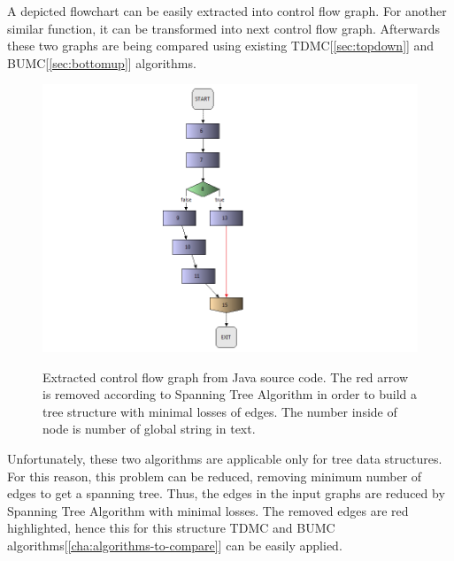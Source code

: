 \documentclass{report}
\begin{document}
A depicted flowchart can be easily extracted into control flow graph. For another similar function, it can be transformed into next control flow graph. Afterwards these two graphs are being compared using existing TDMC[\ref{sec:topdown}] and BUMC[\ref{sec:bottomup}] algorithms. 

\begin{figure}
  \centering
  \includegraphics[scale = 0.5]{Figures/Java-flowchart-exp/control-flow-graph.png}\\[0.1cm]
  \caption[Extracted control flow graph from java source code]{Extracted control flow graph from Java source code. The red arrow is removed according to Spanning Tree Algorithm in order to build a tree structure with minimal losses of edges. The number inside of node is number of global string in text.}
  \label{fig:control-flow-graph}
\end{figure}

Unfortunately, these two algorithms are applicable only for tree data structures. For this reason, this problem can be reduced, removing minimum number of edges to get a spanning tree. Thus, the edges in the input graphs are reduced by Spanning Tree Algorithm with minimal losses. The removed edges are red highlighted, hence this for this structure TDMC and BUMC algorithms[\ref{cha:algorithms-to-compare}] can be easily applied.
\end{document}
